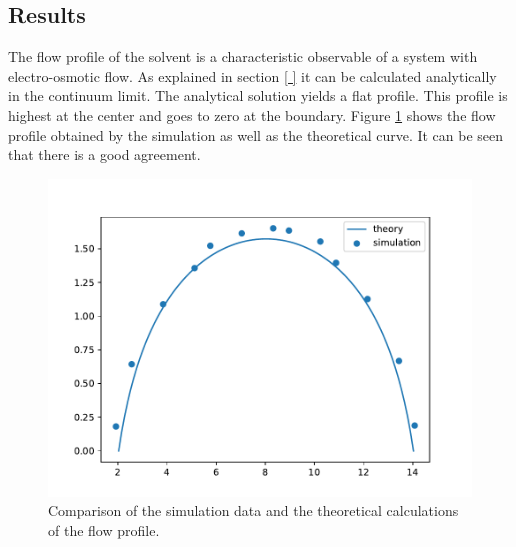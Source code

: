 \subsection{Results}
The flow profile of the solvent is a characteristic observable of a system with electro-osmotic flow. As explained in section \ref{ } it can be calculated analytically in the continuum limit. The analytical solution yields a flat profile. This profile is highest at the center and goes to zero at the boundary. Figure \ref{fig:slit_plot} shows the flow profile obtained by the simulation as well as the theoretical curve. It can be seen that there is a good agreement.

\begin{figure}[H]
	\centering
	\includegraphics[width=\columnwidth]{slit_pore/prodrun_figs/fp}
	\captionsetup{width=\columnwidth}
	\caption{Comparison of the simulation data and the theoretical calculations of the flow profile.}
	\label{fig:slit_plot}
\end{figure}

